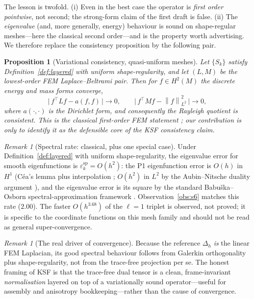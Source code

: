 \documentclass[11pt]{article}
\theoremstyle{plain}
\newtheorem{proposition}[theorem]{Proposition}
\theoremstyle{definition}
\theoremstyle{remark}
\newtheorem{remark}[theorem]{Remark}
\newcommand{\Lap}{\Delta}
\newcommand{\norm}[1]{\left\lVert #1 \right\rVert}
\newcommand{\Order}{O}
\begin{document}
\noindent The lesson is twofold. (i) Even in the best case the operator is
\emph{first order pointwise}, not second; the strong-form claim of the first
draft is false. (ii) The \emph{eigenvalue} (and, more generally, energy)
behaviour is sound on shape-regular meshes---here the classical second
order---and is the property worth advertising. We therefore replace the consistency proposition
by the following pair.

\begin{proposition}[Variational consistency, quasi-uniform meshes]
\label{prop:variational}
Let $\{S_k\}$ satisfy Definition~\ref{def:layered} with uniform
shape-regularity, and let $(L,M)$ be the lowest-order FEM Laplace--Beltrami pair.
Then for $f\in H^2(M)$ the discrete energy and mass forms converge,
\[
\bigl|\, f^{\!\top}Lf - a(f,f)\,\bigr|\to 0,\qquad
\bigl|\, f^{\!\top}Mf - \norm{f}_{L^2}^2\,\bigr|\to 0,
\]
where $a(\cdot,\cdot)$ is the Dirichlet form, and consequently the Rayleigh
quotient is consistent. This is the classical first-order FEM statement
\citep{strang1973analysis,dziuk1988finite}; our contribution is only to identify
it as the defensible core of the KSF consistency claim.
\end{proposition}

\begin{remark}[Spectral rate: classical, plus one special case]
\label{conj:spectral}
Under Definition~\ref{def:layered} with uniform shape-regularity, the
eigenvalue error for smooth eigenfunctions is $\varepsilon^{\mathrm{sp}}_k=\Order(h^{2})$:
the P1 eigenfunction error is $\Order(h)$ in $H^1$ (Céa's lemma plus interpolation
\citep{cea1964approximation,ciarlet1978finite}; $\Order(h^2)$ in $L^2$ by the
Aubin--Nitsche duality argument \citep{aubin1967behavior,nitsche1968kriterium}),
and the eigenvalue error is its square by the standard Babuška--Osborn
spectral-approximation framework \citep{babuska1991eigenvalue,strang1973analysis}. Observation~\ref{obs:s6}
matches this rate ($2.00$). The faster $\Order(h^{3.68})$ of the $\ell=1$
triplet is observed, not proved; it is specific to the coordinate functions on
this mesh family and should not be read as general super-convergence.
\end{remark}

\begin{remark}[The real driver of convergence]
\label{rem:realdriver}
Because the reference $\Lap_h$ \emph{is} the linear FEM Laplacian, its good
spectral behaviour follows from Galerkin orthogonality plus shape-regularity,
not from the trace-free projection per se. The honest framing of KSF is that the
trace-free dual tensor is a clean, frame-invariant \emph{normalisation} layered
on top of a variationally sound operator---useful for assembly and anisotropy
bookkeeping---rather than the cause of convergence.
\end{remark}
\end{document}
